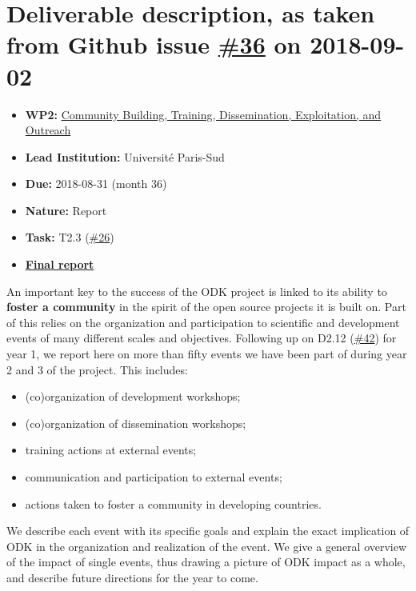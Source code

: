 \section*{\texorpdfstring{Deliverable description, as taken from Github
issue
\href{https://github.com/OpenDreamKit/OpenDreamKit/issues/36}{\#36} on
2018-09-02}{Deliverable description, as taken from Github issue \#36 on 2018-09-02}}\label{deliverable-description-as-taken-from-github-issue-36-on-2018-09-02}

\begin{itemize}
\tightlist
\item
  \textbf{WP2:}
  \href{https://github.com/OpenDreamKit/OpenDreamKit/tree/master/WP2}{Community
  Building, Training, Dissemination, Exploitation, and Outreach}
\item
  \textbf{Lead Institution:} Université Paris-Sud
\item
  \textbf{Due:} 2018-08-31 (month 36)
\item
  \textbf{Nature:} Report
\item
  \textbf{Task:} T2.3
  (\href{https://github.com/OpenDreamKit/OpenDreamKit/issues/26}{\#26})
\item
  \textbf{\href{https://github.com/OpenDreamKit/OpenDreamKit/raw/master/WP2/D2.11/report-final.pdf}{Final
  report}}
\end{itemize}

An important key to the success of the ODK project is linked to its
ability to \textbf{foster a community} in the spirit of the open source
projects it is built on. Part of this relies on the organization and
participation to scientific and development events of many different
scales and objectives. Following up on D2.12
(\href{https://github.com/OpenDreamKit/OpenDreamKit/issues/42}{\#42})
for year 1, we report here on more than fifty events we have been part
of during year 2 and 3 of the project. This includes:

\begin{itemize}
\tightlist
\item
  (co)organization of development workshops;
\item
  (co)organization of dissemination workshops;
\item
  training actions at external events;
\item
  communication and participation to external events;
\item
  actions taken to foster a community in developing countries.
\end{itemize}

We describe each event with its specific goals and explain the exact
implication of ODK in the organization and realization of the event. We
give a general overview of the impact of single events, thus drawing a
picture of ODK impact as a whole, and describe future directions for the
year to come.

